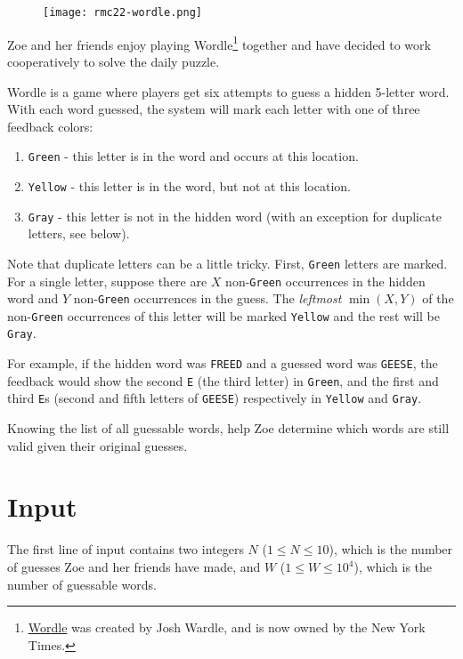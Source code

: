 
\begin{figure}[h]
\begin{center}
  \texttt{[image: rmc22-wordle.png]}
\end{center}
\end{figure}


Zoe and her friends enjoy playing Wordle\footnote{\href{https://www.nytimes.com/games/wordle/}{Wordle} was created by Josh Wardle, and is now owned by the New York Times.} together and have decided to
work cooperatively to solve the daily puzzle.

Wordle is a game where players get six attempts to guess a hidden
5-letter word.  With each word guessed, the system will mark each letter with one of three feedback colors:
\begin{enumerate}
	\item \texttt{Green} - this letter is in the word and occurs at this location.
	\item \texttt{Yellow} - this letter is in the word, but not at this location.
	\item \texttt{Gray} - this letter is not in the hidden word (with an exception for duplicate letters, see below).
\end{enumerate}

Note that duplicate letters can be a little tricky. First, \texttt{Green} letters are marked. For a single
letter, suppose there are $X$ non-\texttt{Green} occurrences in the hidden word and $Y$ non-\texttt{Green}
occurrences in the guess. The \emph{leftmost} $\min(X,Y)$ of the non-\texttt{Green} occurrences of this letter will be marked
\texttt{Yellow} and the rest will be \texttt{Gray}.

For example, if the hidden word was \texttt{FREED} and a guessed word was \texttt{GEESE}, the feedback would show
the second \texttt{E} (the third letter) in \texttt{Green}, and the first and third \texttt{E}s (second and fifth letters of \texttt{GEESE}) respectively in \texttt{Yellow} and \texttt{Gray}.

Knowing the list of all guessable words, help Zoe determine which words
are still valid given their original guesses.

\section*{Input}
The first line of input contains two integers $N$ ($1 \leq N \leq 10$), which is the number of guesses
Zoe and her friends have made, and $W$ ($1 \leq W \leq 10^4$), which is the number of guessable words.

